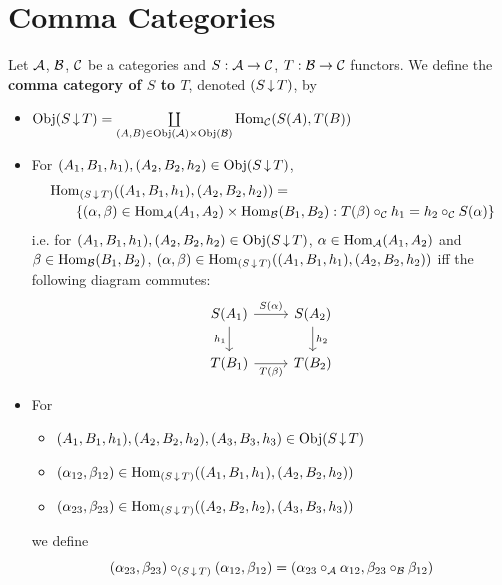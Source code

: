 \documentclass{book}
\begin{document}
	
	
	
	
	
	
	
	
	
	
	
	
	
	
	
	
	
	
	
	















	\section{Comma Categories}

	
	\begin{defn} 
		Let $\mathcal{A}$, $\mathcal{B}$, $\mathcal{C}$ be a categories and $S: \mathcal{A} \rightarrow \mathcal{C}$, $T: \mathcal{B} \rightarrow \mathcal{C}$ functors. We define the \textbf{comma category of $S$ to $T$}, denoted $(S \operatorname{\downarrow} T)$, by 
		\begin{itemize}
			\item $\operatorname{Obj}(S \operatorname{\downarrow} T) = \coprod\limits_{(A,B) \in \operatorname{Obj}(\mathcal{A}) \times \operatorname{Obj}(\mathcal{B})}  \operatorname{Hom}_{\mathcal{C}}(S(A), T(B))$
			\item For $(A_1, B_1, h_1), (A_2, B_2, h_2) \in \operatorname{Obj}(S \operatorname{\downarrow} T)$, 
			\begin{align*}
				& \operatorname{Hom}_{(S \operatorname{\downarrow} T)}((A_1, B_1, h_1), (A_2, B_2, h_2)) = \\
				& \quad \quad \{(\alpha, \beta) \in \operatorname{Hom}_{\mathcal{A}}(A_1, A_2) \times \operatorname{Hom}_{\mathcal{B}}(B_1, B_2): T(\beta) \circ_{\mathcal{C}} h_1 = h_2 \circ_{\mathcal{C}} S(\alpha) \}
			\end{align*}
			i.e. for $(A_1, B_1, h_1), (A_2, B_2, h_2) \in \operatorname{Obj}(S \operatorname{\downarrow} T)$, $\alpha \in \operatorname{Hom}_{\mathcal{A}}(A_1, A_2)$ and $\beta \in \operatorname{Hom}_{\mathcal{B}}(B_1, B_2)$, $(\alpha, \beta) \in \operatorname{Hom}_{(S \operatorname{\downarrow} T)}((A_1, B_1, h_1), (A_2, B_2, h_2))$ iff the following diagram commutes:
			\[ 
			\begin{tikzcd}
				S(A_1) \arrow[r, "S(\al)"] \arrow[d, "h_1"'] & S(A_2)  \arrow[d, "h_2"] \\
				T(B_1) \arrow[r, "T(\be)"']                 & T(B_2)
			\end{tikzcd}
			\]
			\item For 
			\begin{itemize}
				\item $(A_1, B_1, h_1), (A_2, B_2, h_2), (A_3, B_3, h_3) \in \operatorname{Obj}(S \operatorname{\downarrow} T)$
				\item $(\alpha_{12}, \beta_{12}) \in \operatorname{Hom}_{(S \operatorname{\downarrow} T)}((A_1, B_1, h_1), (A_2, B_2, h_2))$
				\item $(\alpha_{23}, \beta_{23}) \in \operatorname{Hom}_{(S \operatorname{\downarrow} T)}((A_2, B_2, h_2), (A_3, B_3, h_3))$
			\end{itemize}
			we define 
			$$(\alpha_{23}, \beta_{23}) \circ_{(S \operatorname{\downarrow} T)} (\alpha_{12}, \beta_{12}) = (\alpha_{23} \circ_{\mathcal{A}} \alpha_{12}, \beta_{23} \circ_{\mathcal{B}} \beta_{12})$$
		\end{itemize}
	\end{defn}
	
\end{document}
